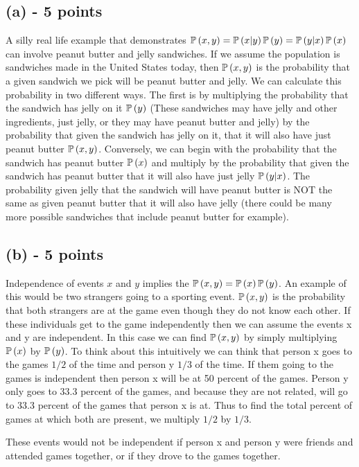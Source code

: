 \documentclass[11pt]{article}
\begin{document}
\subsection*{(a) - 5 points}
A silly real life example that demonstrates $\mathbb{P}\left(x,y\right)=\mathbb{P}\left(x|y\right)\mathbb{P}\left(y\right)=\mathbb{P}\left(y|x\right)\mathbb{P}\left(x\right)$ can involve peanut butter and jelly sandwiches.  If we assume the population is sandwiches made in the United States today, then $\mathbb{P}\left(x,y\right)$ is the probability that a given sandwich we pick will be peanut butter and jelly.  We can calculate this probability in two different ways.  The first is by multiplying the probability that the sandwich has jelly on it $\mathbb{P}\left(y\right)$ (These sandwiches may have jelly and other ingredients, just jelly, or they may have peanut butter and jelly) by the probability that given the sandwich has jelly on it, that it will also have just peanut butter $\mathbb{P}\left(x,y\right)$.  Conversely, we can begin with the probability that the sandwich has peanut butter $\mathbb{P}\left(x\right)$ and multiply by the probability that given the sandwich has peanut butter that it will also have just jelly $\mathbb{P}\left(y|x\right)$.  The probability given jelly that the sandwich will have peanut butter is NOT the same as given peanut butter that it will also have jelly (there could be many more possible sandwiches that include peanut butter for example).

\subsection*{(b) - 5 points}
Independence of events $x$ and $y$ implies the $\mathbb{P}\left(x,y\right)=\mathbb{P}\left(x\right)\mathbb{P}\left(y\right)$.  An example of this would be two strangers going to a sporting event.  $\mathbb{P}\left(x,y\right)$ is the probability that both strangers are at the game even though they do not know each other.  If these individuals get to the game independently then we can assume the events x and y are independent.  In this case we can find $\mathbb{P}\left(x,y\right)$ by simply multiplying $\mathbb{P}\left(x\right)$ by $\mathbb{P}\left(y\right)$.  To think about this intuitively we can think that person x goes to the games $1/2$ of the time and person y $1/3$ of the time.  If them going to the games is independent then person x will be at 50 percent of the games.  Person y only goes to 33.3 percent of the games, and because they are not related, will go to 33.3 percent of the games that person x is at.  Thus to find the total percent of games at which both are present, we multiply $1/2$ by $1/3$.

These events would not be independent if person x and person y were friends and attended games together, or if they drove to the games together.
\end{document}
